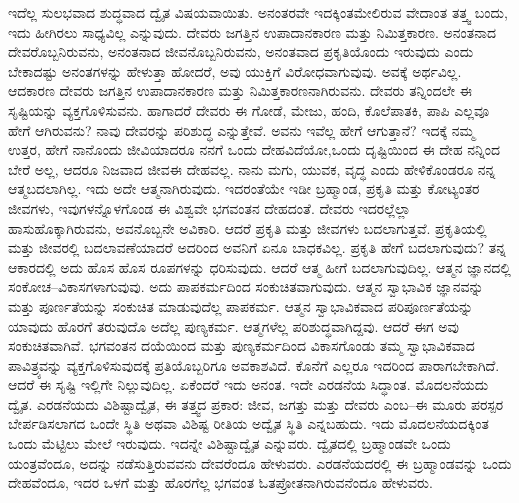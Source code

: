 ಇದೆಲ್ಲ ಸುಲಭವಾದ ಶುದ್ಧವಾದ ದ್ವೈತ ವಿಷಯವಾಯಿತು. ಅನಂತರವೇ ಇದಕ್ಕಿಂತ\break ಮೇಲಿರುವ ವೇದಾಂತ ತತ್ತ್ವ ಬಂದು, ಇದು ಹೀಗಿರಲು ಸಾಧ್ಯವಿಲ್ಲ ಎನ್ನುವುದು. ದೇವರು ಜಗತ್ತಿನ ಉಪಾದಾನಕಾರಣ ಮತ್ತು ನಿಮಿತ್ತಕಾರಣ. ಅನಂತನಾದ ದೇವರೊಬ್ಬ\-ನಿರುವನು, ಅನಂತನಾದ ಜೀವನೊಬ್ಬನಿರುವನು, ಅನಂತವಾದ ಪ್ರಕೃತಿಯೊಂದು ಇರುವುದು ಎಂದು ಬೇಕಾದಷ್ಟು ಅನಂತಗಳನ್ನು ಹೇಳುತ್ತಾ ಹೋದರೆ, ಅವು ಯುಕ್ತಿಗೆ ವಿರೋಧವಾಗುವುವು. ಅವಕ್ಕೆ ಅರ್ಥವಿಲ್ಲ. ಆದಕಾರಣ ದೇವರು ಜಗತ್ತಿನ ಉಪಾದಾನಕಾರಣ ಮತ್ತು ನಿಮಿತ್ತಕಾರಣನಾಗಿರುವನು. ದೇವರು ತನ್ನಿಂದಲೇ ಈ ಸೃಷ್ಟಿಯನ್ನು ವ್ಯಕ್ತಗೊಳಿಸುವನು. ಹಾಗಾದರೆ ದೇವರು ಈ ಗೋಡೆ, ಮೇಜು, ಹಂದಿ, ಕೊಲೆಪಾತಕಿ, ಪಾಪಿ ಎಲ್ಲವೂ ಹೇಗೆ ಆಗಿರುವನು? ನಾವು ದೇವರನ್ನು ಪರಿಶುದ್ಧ ಎನ್ನುತ್ತೇವೆ. ಅವನು ಇವೆಲ್ಲ ಹೇಗೆ ಆಗುತ್ತಾನೆ? ಇದಕ್ಕೆ ನಮ್ಮ ಉತ್ತರ, ಹೇಗೆ ನಾನೊಂದು ಜೀವಿಯಾದರೂ ನನಗೆ ಒಂದು ದೇಹವಿದೆಯೋ,\break ಒಂದು ದೃಷ್ಟಿಯಿಂದ ಈ ದೇಹ ನನ್ನಿಂದ ಬೇರೆ ಅಲ್ಲ, ಆದರೂ ನಿಜವಾದ ಜೀವ\break ಈ ದೇಹವಲ್ಲ. ನಾನು ಮಗು, ಯುವಕ, ವೃದ್ಧ ಎಂದು ಹೇಳಿಕೊಂಡರೂ ನನ್ನ ಆತ್ಮ\break ಬದಲಾಗಿಲ್ಲ. ಇದು ಅದೇ ಆತ್ಮನಾಗಿರುವುದು. ಇದರಂತೆಯೇ ಇಡೀ ಬ್ರಹ್ಮಾಂಡ, ಪ್ರಕೃತಿ ಮತ್ತು ಕೋಟ್ಯಂತರ ಜೀವಗಳು, ಇವುಗಳನ್ನೊಳಗೊಂಡ ಈ ವಿಶ್ವವೇ ಭಗವಂತನ ದೇಹದಂತೆ. ದೇವರು ಇದರಲ್ಲೆಲ್ಲಾ ಹಾಸುಹೊಕ್ಕಾಗಿರುವನು, ಅವನೊಬ್ಬನೇ ಅವಿಕಾರಿ. ಆದರೆ ಪ್ರಕೃತಿ ಮತ್ತು ಜೀವಗಳು ಬದಲಾಗುತ್ತವೆ. ಪ್ರಕೃತಿಯಲ್ಲಿ ಮತ್ತು ಜೀವರಲ್ಲಿ ಬದಲಾವಣೆಯಾದರೆ ಅದರಿಂದ ಅವನಿಗೆ ಏನೂ ಬಾಧಕವಿಲ್ಲ. ಪ್ರಕೃತಿ ಹೇಗೆ ಬದಲಾಗುವುದು? ತನ್ನ ಆಕಾರದಲ್ಲಿ ಅದು ಹೊಸ ಹೊಸ ರೂಪಗಳನ್ನು ಧರಿಸುವುದು. ಆದರೆ ಆತ್ಮ ಹೀಗೆ ಬದಲಾಗುವುದಿಲ್ಲ. ಆತ್ಮನ ಜ್ಞಾನದಲ್ಲಿ ಸಂಕೋಚ–ವಿಕಾಸಗಳಾಗುವುವು. ಅದು ಪಾಪಕರ್ಮದಿಂದ ಸಂಕುಚಿತವಾಗುವುದು. ಆತ್ಮನ ಸ್ವಾಭಾವಿಕ ಜ್ಞಾನವನ್ನು ಮತ್ತು ಪೂರ್ಣತೆಯನ್ನು ಸಂಕುಚಿತ ಮಾಡುವುದೆಲ್ಲ ಪಾಪಕರ್ಮ. ಆತ್ಮನ ಸ್ವಾಭಾವಿಕವಾದ ಪರಿಪೂರ್ಣತೆಯನ್ನು ಯಾವುದು ಹೊರಗೆ ತರುವುದೊ ಅದೆಲ್ಲ ಪುಣ್ಯಕರ್ಮ. ಆತ್ಮಗಳೆಲ್ಲ ಪರಿಶುದ್ಧವಾಗಿದ್ದವು. ಆದರೆ ಈಗ ಅವು ಸಂಕುಚಿತವಾಗಿವೆ. ಭಗವಂತನ ದಯೆಯಿಂದ ಮತ್ತು ಪುಣ್ಯಕರ್ಮದಿಂದ ವಿಕಾಸಗೊಂಡು ತಮ್ಮ ಸ್ವಾಭಾವಿಕವಾದ ಪಾವಿತ್ರ್ಯವನ್ನು ವ್ಯಕ್ತಗೊಳಿಸುವುದಕ್ಕೆ ಪ್ರತಿಯೊಬ್ಬರಿಗೂ ಅವಕಾಶವಿದೆ. ಕೊನೆಗೆ ಎಲ್ಲರೂ ಇದರಿಂದ ಪಾರಾಗಬೇಕಾಗಿದೆ. ಆದರೆ ಈ ಸೃಷ್ಟಿ ಇಲ್ಲಿಗೇ ನಿಲ್ಲುವುದಿಲ್ಲ. ಏಕೆಂದರೆ ಇದು ಅನಂತ. ಇದೇ ಎರಡನೆಯ ಸಿದ್ಧಾಂತ. ಮೊದಲನೆಯದು ದ್ವೈತ. ಎರಡನೆಯದು ವಿಶಿಷ್ಟಾದ್ವೈತ, ಈ ತತ್ತ್ವದ ಪ್ರಕಾರ: ಜೀವ, ಜಗತ್ತು ಮತ್ತು ದೇವರು ಎಂಬ–ಈ ಮೂರು ಪರಸ್ಪರ ಬೇರ್ಪಡಿಸಲಾಗದ ಒಂದೇ ಸ್ಥಿತಿ ಅಥವಾ ವಿಶಿಷ್ಟ ರೀತಿಯ ಅದ್ವೈತ ಸ್ಥಿತಿ ಎನ್ನಬಹುದು. ಇದು ಮೊದಲನೆಯದಕ್ಕಿಂತ ಒಂದು ಮೆಟ್ಟಿಲು ಮೇಲೆ ಇರುವುದು. ಇದನ್ನೇ ವಿಶಿಷ್ಟಾದ್ವೈತ ಎನ್ನುವರು. ದ್ವೈತದಲ್ಲಿ ಬ್ರಹ್ಮಾಂಡವೇ ಒಂದು ಯಂತ್ರವೆಂದೂ, ಅದನ್ನು ನಡೆಸುತ್ತಿರುವವನು ದೇವರೆಂದೂ ಹೇಳುವರು. ಎರಡನೆಯದರಲ್ಲಿ ಈ ಬ್ರಹ್ಮಾಂಡವನ್ನು ಒಂದು ದೇಹವೆಂದೂ, ಇದರ ಒಳಗೆ ಮತ್ತು ಹೊರಗೆಲ್ಲ ಭಗವಂತ ಓತಪ್ರೋತನಾಗಿರುವನೆಂದೂ ಹೇಳುವರು.

